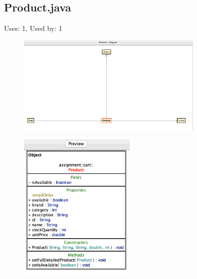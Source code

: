 \documentclass{article}
\begin{document}
\subsection{Product.java}
Uses: 1, Used by: 1
\begin{figure}[H]
    \centering
    \includegraphics[width=0.8\textwidth]{img/productDiagram.png}
\end{figure}
\begin{figure}[H]
    \centering
    \includegraphics[width=0.5\textwidth]{img/productPreview.png}
\end{figure}
\end{document}
